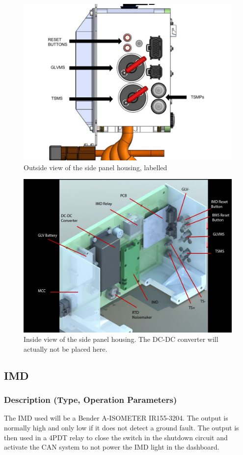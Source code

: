\documentclass{article}
\begin{document}
            \begin{figure}[H]
                \centering
                \includegraphics[width = 0.6 \textwidth]{MCHousingdiagram}
                \caption{Outside view of the side panel housing, labelled}
                \label{cpanel1}
            \end{figure}

            \begin{figure}[H]
                \centering
                \includegraphics[width = 0.6 \textwidth]{MCHousinginside}
                \caption{Inside view of the side panel housing. The DC-DC converter will actually not be placed here.}
                \label{cpanel2}
            \end{figure}

    \subsection{IMD}

        \subsubsection{Description (Type, Operation Parameters)}

            The IMD used will be a Bender A-ISOMETER IR155-3204. The output is normally high and only low if it does not detect a ground fault. The output is then used in a 4PDT relay to close the switch in the shutdown circuit and activate the CAN system to not power the IMD light in the dashboard.
\end{document}
